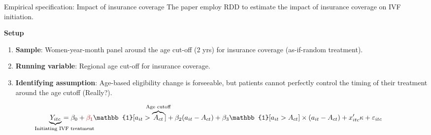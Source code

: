 \documentclass[notes,11pt, aspectratio=169]{beamer}
\begin{document}
\begin{frame}{Empirical specification: Impact of insurance coverage}
	The paper employ RDD to estimate the impact of insurance coverage on IVF initiation.\vspace{1em}

	\begin{block}{\textbf{Setup}}
		\begin{enumerate}
			\item \textbf{Sample}: Women-year-month panel around the age cut-off (2 yrs) for insurance coverage (as-if-random treatment).	
			\item \textbf{Running variable}: Regional age cut-off for insurance coverage.
			\item \textbf{Identifying assumption}: Age-based eligibility change is forseeable, but patients cannot perfectly control the timing of their treatment around the age cutoff (Really?).
		\end{enumerate}
	
	\end{block}

	\begin{align}
		\underbrace{Y_{itc}}_{\hidewidth \text{\hspace{3em} Initiating IVF treatment} \hidewidth} = \beta_0 + \textcolor{red}{\beta_1}\mathbb{1} [ a_{it} > \overbrace{A_{ct}}^{\hidewidth \text{Age cutoff} \hidewidth} ] + \beta_2 (a_{it} - A_{ct}) + \beta_3 \mathbb{1} [a_{it} > A_{ct}] \times (a_{it} - A_{ct}) + x'_{itc} \kappa + \varepsilon_{itc}\nonumber
	\end{align}
\end{frame}
\end{document}

